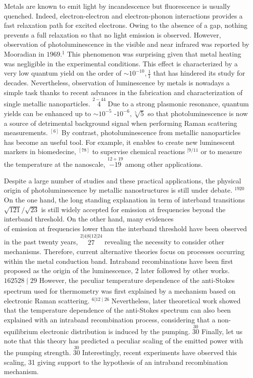 \documentclass[10pt]{article}
\begin{document}
Metals are known to emit light by incandescence but fluorescence is usually quenched. Indeed, electron-electron and electron-phonon interactions provides a fast relaxation path for excited electrons. Owing to the absence of a gap, nothing prevents a full relaxation so that no light emission is observed. However, observation of photoluminescence in the visible and near infrared was reported by Mooradian in $1969 .{ }^{\underline{1}}$ This phenomenon was surprising given that metal heating was negligible in the experimental conditions. This effect is characterized by a very low quantum yield on the order of $\sim 10^{-10}, \frac{1}{1}$ that has hindered its study for decades. Nevertheless, observation of luminescence by metals is nowadays a simple task thanks to recent advances in the fabrication and characterization of single metallic nanoparticles. $\stackrel{2-44}{4}$ Due to a strong plasmonic resonance, quantum yields can be enhanced up to $\sim 10^{-5}$ -$10^{-6}, \sqrt[5]{5}$ so that photoluminescence is now a source of detrimental background signal when performing Raman scattering measurements. ${ }^{[6]}$ By contrast, photoluminescence from metallic nanoparticles has become an useful tool. For example, it enables to create new luminescent markers in biomedecine, ${ }^{[78]}$ to supervise chemical reactions ${ }^{[9 / 11}$ or to measure the temperature at the nanoscale, $\stackrel{12+19}{-19}$ among other applications.

Despite a large number of studies and these practical applications, the physical origin of photoluminescence by metallic nanostructures is still under debate. ${ }^{1920}$ On the one hand, the long standing explanation in term of interband transitions $\sqrt{121} / \sqrt{23}$ is still widely accepted for emission at frequencies beyond the interband threshold. On the other hand, many evidences\\
of emission at frequencies lower than the interband threshold have been observed in the past twenty years, $\stackrel{2|4| 6|12| 24}{27}$ revealing the necessity to consider other mechanisms. Therefore, current alternative theories focus on processes occurring within the metal conduction band. Intraband recombinations have been first proposed as the origin of the luminescence, 2 later followed by other works. $\underline{162528 \mid 29}$ However, the peculiar temperature dependence of the anti-Stokes spectrum used for thermometry was first explained by a mechanism based on electronic Raman scattering. $\stackrel{6[12 \mid 26}{ }$ Nevertheless, later theoretical work showed that the temperature dependence of the anti-Stokes spectrum can also been explained with an intraband recombination process, considering that a non-equilibrium electronic distribution is induced by the pumping. $\stackrel{30}{30}$ Finally, let us note that this theory has predicted a peculiar scaling of the emitted power with the pumping strength. $\stackrel{30}{30}$ Interestingly, recent experiments have observed this scaling, 31 giving support to the hypothesis of an intraband recombination mechanism.
\end{document}

